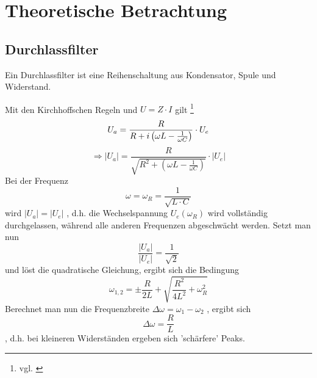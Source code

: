 \section{Theoretische Betrachtung}
\subsection{Durchlassfilter}
Ein Durchlassfilter ist eine Reihenschaltung aus Kondensator, Spule und Widerstand. 

Mit den Kirchhoffschen Regeln und 
$
U=Z\cdot I
$ 
gilt \footnote{vgl. \cite[151 ff.]{demtroder2009experimentalphysik}}
\begin{equation}
U_a=\frac{R}{R+i\left(\omega L-\frac{1}{\omega C}\right)}\cdot U_e\\
\end{equation}
\begin{equation}
\Rightarrow\left| U_a \right| = \frac{R}{\sqrt{R^2+\left(\omega L - \frac{1}{\omega C}\right)}}\cdot \left| U_e \right|
\end{equation}
Bei der Frequenz
\begin{equation}
\omega=\omega_R=\frac{1}{\sqrt{L\cdot C}}
\end{equation}
wird
$
\left|U_a \right| = \left|U_e \right|
$
, d.h. die Wechselspannung $U_e(\omega_R)$ wird vollständig durchgelassen, während alle anderen Frequenzen abgeschwächt werden.
  Setzt man nun
\begin{equation}
\frac{\left|U_a \right|}{\left|U_e \right|}=\frac{1}{\sqrt{2}}
\end{equation}
und löst die quadratische Gleichung, ergibt sich die Bedingung
\begin{equation}
\omega_{1,2}=\pm \frac{R}{2L}+\sqrt{\frac{R^2}{4L^2}+\omega_R^2}
\end{equation}
Berechnet man nun die Frequenzbreite
$
\Delta \omega=\omega_1-\omega_2
$
, ergibt sich
\begin{equation}
\Delta \omega=\frac{R}{L}
\end{equation}
, d.h. bei kleineren Widerständen ergeben sich 'schärfere' Peaks.
